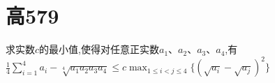 \documentclass[]{article}
\title{}
\author{}
\date{}
\begin{document}
\maketitle
\section{高579}{
求实数$c$的最小值,使得对任意正实数$a_1、a_2、a_3、a_4$,有\\
$\displaystyle\frac{1}{4}\sum\limits_{i=1}^4a_i-\sqrt[4]{a_1a_2a_3a_4}\leq c \max_{1\leq i<j\leq 4}{ \{(\sqrt{a_i}-\sqrt{a_j})^2\}}$
}
\end{document}
